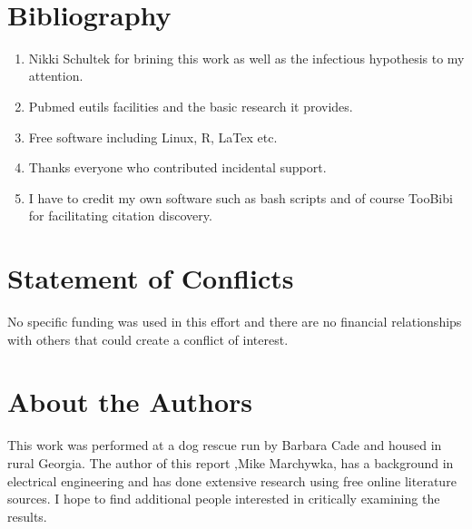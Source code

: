 \documentclass[aps,secnumarabic,balancelastpage,amsmath,amssymb,nofootinbib]{revtex4}
\newcommand{\mjmbasename}{\jobname}
\newcommand{\mjmaddbio}{mjm_tr,releases,dailysnapx}
\begin{document}
\begin{lstlisting}


\end{lstlisting}
\section{Bibliography}






\begin{acknowledgments} 

% 
\begin{enumerate}
\item Nikki Schultek for brining this work \cite{Schultek_Nikki_Schultek_LinkedIn_2023} as well as the infectious hypothesis to my attention. 
\item Pubmed eutils facilities and the basic research it provides. 
\item Free software including Linux, R, LaTex  etc.
\item Thanks everyone who contributed incidental support. 
\item I have to credit my own software such as bash scripts
 and of course TooBibi\cite{mmarchywka-MJM-2021-002-v0.1.1-rg} for facilitating citation discovery. 
\end{enumerate}

\end{acknowledgments}

\clearpage
\appendix


\section{ Statement of Conflicts }
 No specific funding was used in this effort and there are no financial
relationships with others that could create a conflict of interest. 

\section{About the Authors}
This work was performed at a dog rescue run by Barbara Cade and
housed in rural Georgia.  The author of this report 
,Mike Marchywka,
has a background in electrical engineering and 
has done extensive research using free online literature sources.  
I hope to find additional people interested in critically 
examining the results.
\end{document}
